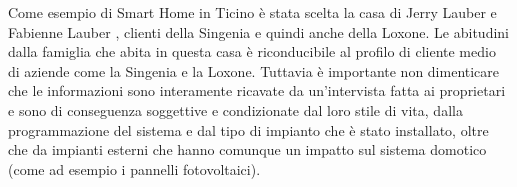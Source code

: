 Come esempio di Smart Home in Ticino è stata scelta la casa di Jerry Lauber e Fabienne Lauber , clienti della Singenia e quindi anche della Loxone. Le abitudini dalla famiglia che abita in questa casa è riconducibile al profilo di cliente medio di aziende come la Singenia e la Loxone. Tuttavia è importante non dimenticare che le informazioni sono interamente ricavate da un’intervista fatta ai proprietari e sono di conseguenza soggettive e condizionate dal loro stile di vita, dalla programmazione del sistema e dal tipo di impianto che è stato installato, oltre che da impianti esterni che hanno comunque un impatto sul sistema domotico (come ad esempio i pannelli fotovoltaici). 